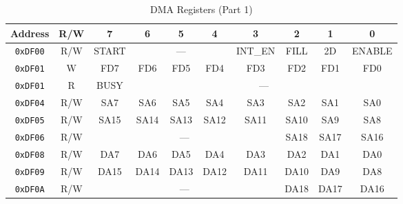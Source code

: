 \begin{table}[ht]
    \begin{center}
        \begin{tabular}{|c|c|c|c|c|c|c|c|c|c|} \hline
            Address & R/W & 7 & 6 & 5 & 4 & 3 & 2 & 1 & 0 \\\hline\hline
            \verb+0xDF00+ & R/W & START & \multicolumn{3}{|c|}{---} & INT\_EN & FILL & 2D & ENABLE \\ \hline
            \verb+0xDF01+ & W & FD7 & FD6 & FD5 & FD4 & FD3 & FD2 & FD1 & FD0 \\ \hline
            \verb+0xDF01+ & R & BUSY & \multicolumn{7}{|c|}{---}  \\ \hline\hline

            \verb+0xDF04+ & R/W & SA7 & SA6 & SA5 & SA4 & SA3 & SA2 & SA1 & SA0 \\ \hline
            \verb+0xDF05+ & R/W & SA15 & SA14 & SA13 & SA12 & SA11 & SA10 & SA9 & SA8 \\ \hline
            \verb+0xDF06+ & R/W & \multicolumn{5}{|c|}{---} & SA18 & SA17 & SA16 \\ \hline\hline

            \verb+0xDF08+ & R/W & DA7 & DA6 & DA5 & DA4 & DA3 & DA2 & DA1 & DA0 \\ \hline
            \verb+0xDF09+ & R/W & DA15 & DA14 & DA13 & DA12 & DA11 & DA10 & DA9 & DA8 \\ \hline
            \verb+0xDF0A+ & R/W & \multicolumn{5}{|c|}{---} & DA18 & DA17 & DA16 \\ \hline
        \end{tabular}
    \end{center}
    \caption{DMA Registers (Part 1)}
    \label{tab:dma_reg}
\end{table}

